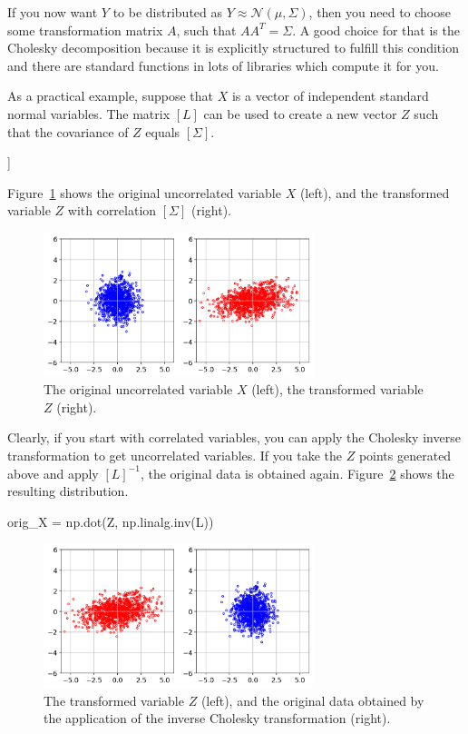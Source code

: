 If you now want $Y$ to be distributed as $Y\approx\mathcal{N}(\mu,\Sigma)$, then you need to choose some transformation matrix $A$, such that $AA^{T}=\Sigma$. A good choice for that is the Cholesky decomposition because it is explicitly structured to fulfill this condition and there are standard functions in lots of libraries which compute it for you.

As a practical example, suppose that $X$ is a vector of independent standard normal variables. The matrix $[L]$ can be used to create a new vector $Z$ such that the covariance of $Z$ equals $[\Sigma]$.


\begin{ioutput}
[[1.73205081 0.        ]
 [0.57735027 0.81649658]]
\end{ioutput}

Figure~\ref{fig:cholesky_norm} shows the original uncorrelated variable $X$ (left), and the transformed variable $Z$ with correlation $[\Sigma]$ (right).

\begin{figure}[htbp]
\centering
\includegraphics[width=0.7\textwidth]{figures/cholesky_norm}
\caption{The original uncorrelated variable $X$ (left), the transformed variable $Z$ (right).}
\label{fig:cholesky_norm}
\end{figure}

Clearly, if you start with correlated variables, you can apply the Cholesky inverse transformation to get uncorrelated variables.
If you take the $Z$ points generated above and apply $[L]^{-1}$, the original data is obtained again. Figure~\ref{fig:cholesky_inv} shows the resulting distribution.

\begin{ipython}
orig_X = np.dot(Z, np.linalg.inv(L))
\end{ipython}

\begin{figure}[htbp]
\centering
\includegraphics[width=0.7\textwidth]{figures/cholesky_inv}
\caption{The transformed variable $Z$ (left), and the original data obtained by the application of the inverse Cholesky transformation (right).}
\label{fig:cholesky_inv}
\end{figure}

